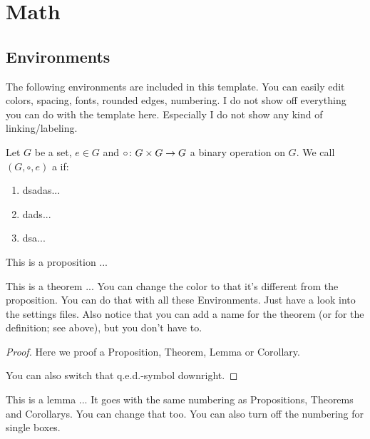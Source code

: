 \documentclass[11pt, a4paper]{article}
\begin{document}
\section{Math}

\subsection{Environments}

The following environments are included in this template. You can easily edit colors, spacing, fonts, rounded edges, numbering.
I do not show off everything you can do with the template here. Especially I do not show any kind of linking/labeling.

\begin{definition}[Group]
  Let $G$ be a set, $e \in G$ and $\circ \colon G \times G \to G$ a binary operation on $G$. We call $(G, \circ, e)$ a  if:

  \begin{enumerate}[(G1)]
  \item dsadas...
  \item dads...
  \item dsa...
  \end{enumerate}
\end{definition}

\begin{proposition}
  This is a proposition ...
\end{proposition}

\begin{theorem}
  This is a theorem ...
  You can change the color to that it's different from the proposition. You can do that with all these Environments. Just have a look into the settings files. Also notice that you can add a name for the theorem (or for the definition; see above), but you don't have to.
\end{theorem}

\begin{proof}
  Here we proof a Proposition, Theorem, Lemma or Corollary.

  You can also switch that q.e.d.-symbol downright.
\end{proof}

\begin{lemma}
  This is a lemma ...
  It goes with the same numbering as Propositions, Theorems and Corollarys. You can change that too. You can also turn off the numbering for single boxes.
\end{lemma}
\end{document}
